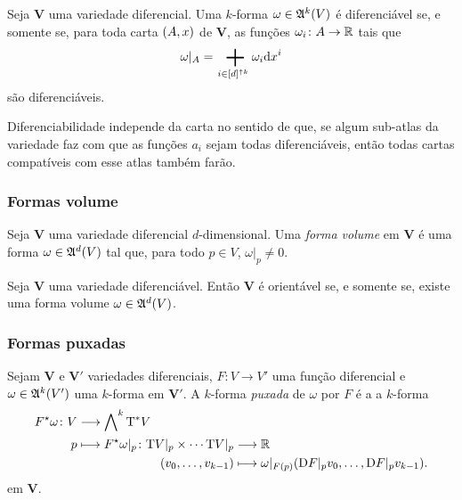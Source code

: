 \begin{proposition}
Seja $\bm V$ uma variedade diferencial. Uma $k$-forma $\omega \in \mathfrak{A}^k(V)$ é diferenciável se, e somente se, para toda carta $(A,x)$ de $\bm V$, as funções $\omega_i\colon A \to \mathbb{R}$ tais que
	\begin{equation*}
	\omega|_A = \sum_{i \in [d]^{\uparrow k}} \omega_i \dd\x^i
	\end{equation*}
são diferenciáveis.
\end{proposition}

Diferenciabilidade independe da carta no sentido de que, se algum sub-atlas da variedade faz com que as funções $a_i$ sejam todas diferenciáveis, então todas cartas compatíveis com esse atlas também farão.

\subsubsection{Formas volume}

\begin{definition}
Seja $\bm V$ uma variedade diferencial $d$-dimensional. Uma \emph{forma volume} em $\bm V$ é uma forma $\omega \in \mathfrak{A}^d (V)$ tal que, para todo $p \in V$, $\omega|_p \neq 0$.
\end{definition}

\begin{proposition}
Seja $\bm V$ uma variedade diferenciável. Então $\bm V$ é orientável se, e somente se, existe uma forma volume $\omega \in \mathfrak{A}^d (V)$.
\end{proposition}

\subsubsection{Formas puxadas}

\begin{definition}
Sejam $\bm V$ e $\bm V'$ variedades diferenciais, $F\colon V \to V'$ uma função diferencial e $\omega \in \mathfrak{A}^k (V')$ uma $k$-forma em $\bm V'$. A $k$-forma \emph{puxada} de $\omega$ por $F$ é a a $k$-forma
	\begin{align*}
	\func{F\pux \omega}{V}{\bigwedge\nolimits^k \Tg\dual V}{p}{
	\begin{aligned}[t]
	\func{F\pux \omega|_p}{\Tg V|_p \times \cdots \Tg V|_p}{\R}{(v_0,\ldots,v_{k-1})}{\omega|_{F(p)}(\D F|_p v_0,\ldots,\D F|_p v_{k-1}).}
	\end{aligned}
	}
	\end{align*}
em $\bm V$.
\end{definition}

